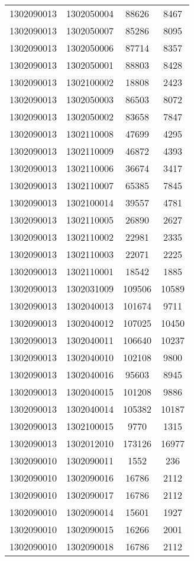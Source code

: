 \begin{longtable}[h]{llcc}
		1302090013 & 1302050004 & 88626 & 8467\\
		1302090013 & 1302050007 & 85286 & 8095\\
		1302090013 & 1302050006 & 87714 & 8357\\
		1302090013 & 1302050001 & 88803 & 8428\\
		1302090013 & 1302100002 & 18808 & 2423\\
		1302090013 & 1302050003 & 86503 & 8072\\
		1302090013 & 1302050002 & 83658 & 7847\\
		1302090013 & 1302110008 & 47699 & 4295\\
		1302090013 & 1302110009 & 46872 & 4393\\
		1302090013 & 1302110006 & 36674 & 3417\\
		1302090013 & 1302110007 & 65385 & 7845\\
		1302090013 & 1302100014 & 39557 & 4781\\
		1302090013 & 1302110005 & 26890 & 2627\\
		1302090013 & 1302110002 & 22981 & 2335\\
		1302090013 & 1302110003 & 22071 & 2225\\
		1302090013 & 1302110001 & 18542 & 1885\\
		1302090013 & 1302031009 & 109506 & 10589\\
		1302090013 & 1302040013 & 101674 & 9711\\
		1302090013 & 1302040012 & 107025 & 10450\\
		1302090013 & 1302040011 & 106640 & 10237\\
		1302090013 & 1302040010 & 102108 & 9800\\
		1302090013 & 1302040016 & 95603 & 8945\\
		1302090013 & 1302040015 & 101208 & 9886\\
		1302090013 & 1302040014 & 105382 & 10187\\
		1302090013 & 1302100015 & 9770 & 1315\\
		1302090013 & 1302012010 & 173126 & 16977\\
		1302090010 & 1302090011 & 1552 & 236\\
		1302090010 & 1302090016 & 16786 & 2112\\
		1302090010 & 1302090017 & 16786 & 2112\\
		1302090010 & 1302090014 & 15601 & 1927\\
		1302090010 & 1302090015 & 16266 & 2001\\
		1302090010 & 1302090018 & 16786 & 2112\\

\end{longtable}
